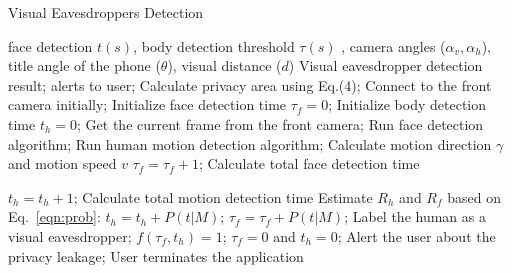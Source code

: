 \begin{algorithm}[H]
\caption{Visual Eavesdroppers Detection}
\label{alg:Framework}
\begin{algorithmic}[1]
\REQUIRE  face detection $t(s)$, body detection  threshold $\tau(s)$ , camera angles ($\alpha_v,\alpha_h$), title angle of the phone ($\theta$), visual distance ($d$)
\ENSURE   Visual eavesdropper detection result;
             alerts to user;
\STATE Calculate privacy area using Eq.(4);
\label{alg:line:1}
\STATE Connect to the front camera initially;
\STATE Initialize  face detection time $\tau_f=0$;
\STATE Initialize body detection time $\textit{t}_h=0$;
\REPEAT
\STATE Get the current frame from the front camera;
\STATE Run face detection algorithm;
\STATE Run human motion detection algorithm;
\STATE Calculate motion direction $\gamma$ and motion speed $v$
\ENDIF
{}
\STATE $\tau_f=\tau_f+1$; Calculate  total face detection time
\label{alg:line:2}
\ENDIF

\STATE $\textit{t}_h=\textit{t}_h+1$;  Calculate  total motion detection time
\label{alg:line:3}
\ENDIF
{}
\STATE Estimate $R_h$ and $R_f$ based on Eq.~\ref{eqn:prob}:
\STATE $\textit{t}_h=\textit{t}_h+P(t|M)$;
\STATE $\tau_f=\tau_f+P(t|M)$;
\label{alg:line:4}
\ENDIF
{}
\label{alg:line:5}
\STATE Label the human as a visual eavesdropper;
\STATE $f(\tau_f,\textit{t}_h)=1$;
\STATE $\tau_f=0$ and $\textit{t}_h=0$;
\STATE Alert the user about the  privacy leakage;
\ENDIF
\UNTIL User terminates the application




\end{algorithmic}
\end{algorithm}


